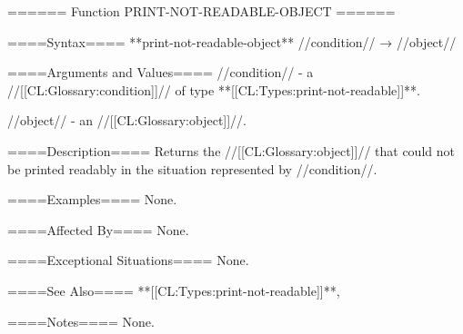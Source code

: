 ====== Function PRINT-NOT-READABLE-OBJECT ======

====Syntax====
**print-not-readable-object** //condition// → //object//

====Arguments and Values====
//condition// - a //[[CL:Glossary:condition]]// of type **[[CL:Types:print-not-readable]]**.

//object// - an //[[CL:Glossary:object]]//.

====Description====
Returns the //[[CL:Glossary:object]]// that could not be printed readably in the situation represented by //condition//.

====Examples====
None.

====Affected By====
None.

====Exceptional Situations====
None.

====See Also====
**[[CL:Types:print-not-readable]]**,{\secref\Conditions}

====Notes====
None.

